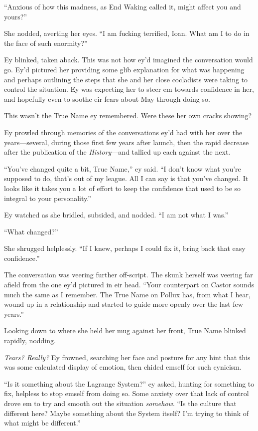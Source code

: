 ``Anxious of how this madness, as End Waking called it, might affect you and yours?''

She nodded, averting her eyes. ``I am fucking terrified, Ioan. What am I to do in the face of such enormity?''

Ey blinked, taken aback. This was not how ey'd imagined the conversation would go. Ey'd pictured her providing some glib explanation for what was happening and perhaps outlining the steps that she and her close cocladists were taking to control the situation. Ey was expecting her to steer em towards confidence in her, and hopefully even to soothe eir fears about May through doing so.

This wasn't the True Name ey remembered. Were these her own cracks showing?

Ey prowled through memories of the conversations ey'd had with her over the years—several, during those first few years after launch, then the rapid decrease after the publication of the \emph{History}—and tallied up each against the next.

``You've changed quite a bit, True Name,'' ey said. ``I don't know what you're supposed to do, that's out of my league. All I can say is that you've changed. It looks like it takes you a lot of effort to keep the confidence that used to be so integral to your personality.''

Ey watched as she bridled, subsided, and nodded. ``I am not what I was.''

``What changed?''

She shrugged helplessly. ``If I knew, perhaps I could fix it, bring back that easy confidence.''

The conversation was veering further off-script. The skunk herself was veering far afield from the one ey'd pictured in eir head. ``Your counterpart on Castor sounds much the same as I remember. The True Name on Pollux has, from what I hear, wound up in a relationship and started to guide more openly over the last few years.''

Looking down to where she held her mug against her front, True Name blinked rapidly, nodding.

\emph{Tears? Really?} Ey frowned, searching her face and posture for any hint that this was some calculated display of emotion, then chided emself for such cynicism.

``Is it something about the Lagrange System?'' ey asked, hunting for something to fix, helpless to stop emself from doing so. Some anxiety over that lack of control drove em to try and smooth out the situation \emph{somehow}. ``Is the culture that different here? Maybe something about the System itself? I'm trying to think of what might be different.''

